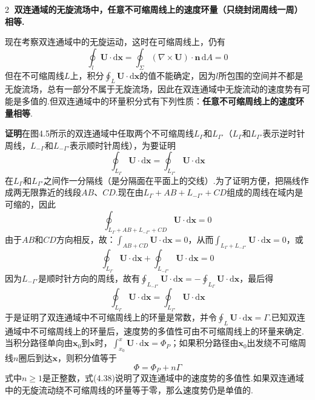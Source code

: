 \textcircled{2} \textbf{双连通域的无旋流场中，任意不可缩周线上的速度环量（只绕封闭周线一周）相等.}

现在考察双连通域中的无旋运动，这时在可缩周线上，仍有
\[
\oint_l\boldsymbol{U}\cdot\mathrm{d}\boldsymbol{x}=\oint_\Sigma(\nabla\times\boldsymbol{U})\cdot\boldsymbol{n}\,\mathrm{d}A=0
\]
但在不可缩周线$L$上，积分$\displaystyle\oint_L\boldsymbol{U}\cdot\mathrm{d}\boldsymbol{x}$的值不能确定，因为$l$所包围的空间并不都是无旋流场，总有一部分不属于无旋流场，因此在双连通域中无旋流动的速度势有可能是多值的.但双连通域中的环量积分式有下列性质：\textbf{任意不可缩周线上的速度环量相等}.

\textbf{证明}\quad 在图4.5所示的双连通域中任取两个不可缩周线$L_\Gamma$和$L_{\Gamma'}$（$L_\Gamma$和$L_{\Gamma'}$表示逆时针周线，$L_{-\Gamma}$和$L_{-\Gamma'}$表示顺时针周线），为要证明
\[
\oint_{L_\Gamma}\boldsymbol{U}\cdot\mathrm{d}\boldsymbol{x}=\oint_{L_{\Gamma'}}\boldsymbol{U}\cdot\mathrm{d}\boldsymbol{x}
\]
在$L_\Gamma$和$L_{\Gamma'}$之间作一分隔线（是分隔面在平面上的交线）.为了证明方便，把隔线作成两无限靠近的线段$AB$、$CD$.现在由$L_\Gamma+AB+L_{-\Gamma'}+CD$组成的周线在域内是可缩的，因此
\[
\oint_{L_\Gamma+AB+L_{-\Gamma'}+CD}\boldsymbol{U}\cdot\mathrm{d}\boldsymbol{x}=0
\]
由于$AB$和$CD$方向相反，故：$\displaystyle\int_{AB+CD}\boldsymbol{U}\cdot\mathrm{d}\boldsymbol{x}=0$，从而$\displaystyle\int_{L_\Gamma+L_{-\Gamma'}}\boldsymbol{U}\cdot\mathrm{d}\boldsymbol{x}=0$，或
\[
\oint_{L_\Gamma}\boldsymbol{U}\cdot\mathrm{d}\boldsymbol{x}+\oint_{L_{-\Gamma'}}\boldsymbol{U}\cdot\mathrm{d}\boldsymbol{x}=0
\]
因为$L_{-\Gamma'}$是顺时针方向的周线，故有$\displaystyle\oint_{L_{-\Gamma'}}\boldsymbol{U}\cdot\mathrm{d}\boldsymbol{x}=-\oint_{L_{\Gamma}}\boldsymbol{U}\cdot\mathrm{d}\boldsymbol{x}$，最后得
\[
\oint_{L_\Gamma}\boldsymbol{U}\cdot\mathrm{d}\boldsymbol{x}=\oint_{L_{\Gamma'}}\boldsymbol{U}\cdot\mathrm{d}\boldsymbol{x}
\]
于是证明了双连通域中不可缩周线上的环量是常数，并令$\displaystyle\oint_L\boldsymbol{U}\cdot\mathrm{d}\boldsymbol{x}=\Gamma$.已知双连通域中不可缩周线上的环量后，速度势的多值性可由不可缩周线上的环量来确定.当积分路径单向由$\boldsymbol{x}_0$到$\boldsymbol{x}$时，$\displaystyle\int_{x_0}^{x}\boldsymbol{U}\cdot\mathrm{d}\boldsymbol{x}=\Phi_P$；如果积分路径由$\boldsymbol{x}_0$出发绕不可缩周线$n$圈后到达$\boldsymbol{x}$，则积分值等于
\begin{equation*}
\Phi=\Phi_P+n\Gamma
\tag{4.38}
\end{equation*}
式中$n\geqslant 1$是正整数，式(4.38)说明了双连通域中的速度势的多值性.如果双连通域中的无旋流动绕不可缩周线的环量等于零，那么速度势仍是单值的.

